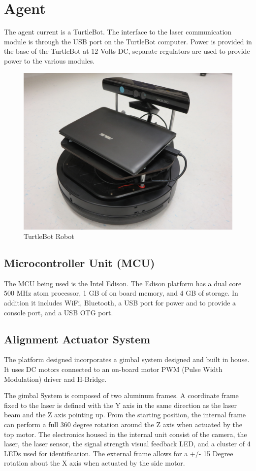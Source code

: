\documentclass[botnum, fleqn]{unmeethesis}
\begin{document}
\section*{Agent}
The agent current is a TurtleBot. The interface to the laser communication module is through the USB port on the TurtleBot computer. Power is provided in the base of the TurtleBot at 12 Volts DC, separate regulators are used to provide power to the various modules. 

\begin{figure}[ht]
 \begin{center}
  \includegraphics[width=0.5 \textwidth]{figures/TurtleBot.JPG}
  \caption{\small \label{fig:turtlebot} TurtleBot Robot}
 \end{center}
\end{figure}


\subsection*{Microcontroller Unit (MCU)}
The MCU being used is the Intel Edison. The Edison platform has a dual core 500 MHz atom processor, 1 GB of on board memory, and 4 GB of storage. In addition it includes WiFi, Bluetooth, a USB port for power and to provide a console port, and a USB OTG port. 

\subsection*{Alignment Actuator System}
The platform designed incorporates a gimbal system designed and built in house. It uses DC motors connected to an on-board motor PWM (Pulse Width Modulation) driver and H-Bridge.

The gimbal System is composed of two aluminum frames. A coordinate frame fixed to the laser is defined with the Y axis in the same direction as the laser beam and the Z axis pointing up. From the starting position, the internal frame can perform a full 360 degree rotation around the Z axis when actuated by the top motor. The electronics housed in the internal unit consist of the camera, the laser, the laser sensor, the signal strength visual feedback LED, and a cluster of 4 LEDs used for identification. The external frame allows for a +/- 15 Degree rotation about the X axis when actuated by the side motor.
\end{document}
